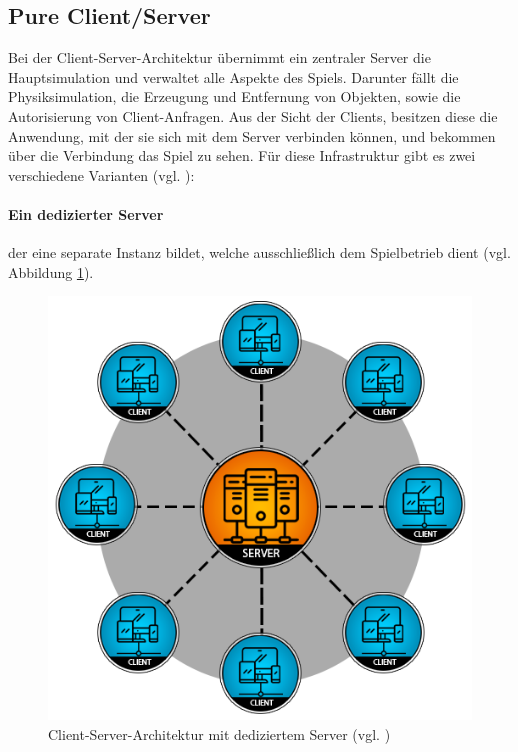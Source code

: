 \subsection{Pure Client/Server}
Bei der Client-Server-Architektur übernimmt ein zentraler Server die Hauptsimulation und verwaltet alle Aspekte des Spiels. Darunter fällt die Physiksimulation, die Erzeugung und Entfernung von Objekten, sowie die Autorisierung von Client-Anfragen. Aus der Sicht der Clients, besitzen diese die Anwendung, mit der sie sich mit dem Server verbinden können, und bekommen über die Verbindung das Spiel zu sehen.
Für diese Infrastruktur gibt es zwei verschiedene Varianten (vgl. \cite{noauthor_client-server_2024}):
\paragraph{Ein dedizierter Server} der eine separate Instanz bildet, welche ausschließlich dem Spielbetrieb dient (vgl. Abbildung \ref{fig:dedicated_server}).

\begin{figure}[ht]
\centering
\includegraphics[width=1\linewidth]{content/pictures/ded_server-d5369721966357b9b4d5e1fa96b05b22.png}
\caption{Client-Server-Architektur mit dediziertem Server (vgl. \cite{noauthor_network_2024})}
\label{fig:dedicated_server}
\end{figure}

